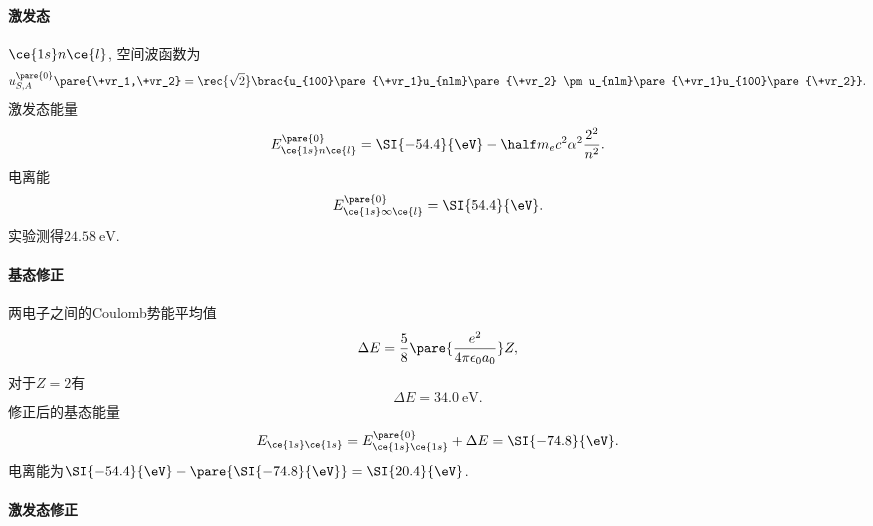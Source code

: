 \documentclass[hidelinks]{ctexart}
\begin{document}

\paragraph{激发态} %
\label{par:激发态}

$\ce{1s}n\ce{l}$, 空间波函数为
\[ u_{S,A}^{\pare{0}}\pare{\+vr_1,\+vr_2} = \rec{\sqrt{2}}\brac{u_{100}\pare{\+vr_1}u_{nlm}\pare{\+vr_2} \pm u_{nlm}\pare{\+vr_1}u_{100}\pare{\+vr_2}}. \]
激发态能量
\[ E_{\ce{1s}n\ce{l}}^{\pare{0}} = \SI{-54.4}{\eV} - \half m_e c^2 \alpha^2 \frac{2^2}{n^2}. \]
电离能
\[ E_{\ce{1s}\infty\ce{l}}^{\pare{0}} = \SI{54.4}{\eV}. \]
实验测得$\SI{24.58}{\eV}$.


\paragraph{基态修正} %
\label{par:基态修正}

两电子之间的Coulomb势能平均值
\[ \Delta E = \frac{5}{8}\pare{\frac{e^2}{4\pi\epsilon_0 a_0}}Z, \]
对于$Z=2$有
\[ \Delta E = \SI{34.0}{\eV}. \]
修正后的基态能量
\[ E_{\ce{1s}\ce{1s}} = E_{\ce{1s}\ce{1s}}^{\pare{0}} + \Delta E = \SI{-74.8}{\eV}. \]
电离能为$\SI{-54.4}{\eV} - \pare{\SI{-74.8}{\eV}} = \SI{20.4}{\eV}$.


\paragraph{激发态修正} %
\label{par:激发态修正}
\end{document}
